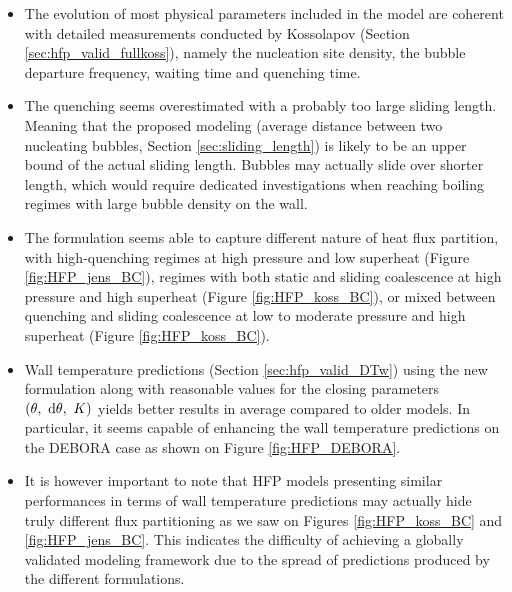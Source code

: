 \begin{itemize}
\item The evolution of most physical parameters included in the model are coherent with detailed measurements conducted by Kossolapov \cite{kossolapov_experimental_2021} (Section \ref{sec:hfp_valid_fullkoss}), namely the nucleation site density, the bubble departure frequency, waiting time and quenching time.

\item The quenching seems overestimated with a probably too large sliding length. Meaning that the proposed modeling (\ie average distance between two nucleating bubbles, Section \ref{sec:sliding_length}) is likely to be an upper bound of the actual sliding length. Bubbles may actually slide over shorter length, which would require dedicated investigations when reaching boiling regimes with large bubble density on the wall.

\item The formulation seems able to capture different nature of heat flux partition, with high-quenching regimes at high pressure and low superheat (Figure \ref{fig:HFP_jens_BC}), regimes with both static and sliding coalescence at high pressure and high superheat (Figure \ref{fig:HFP_koss_BC}), or mixed between quenching and sliding coalescence at low to moderate pressure and high superheat (Figure \ref{fig:HFP_koss_BC}).

\item Wall temperature predictions (Section \ref{sec:hfp_valid_DTw}) using the new formulation along with reasonable values for the closing parameters $\left( \theta,\ \mathrm{d}\theta,\ K  \right)$ yields better results in average compared to older models. In particular, it seems capable of enhancing the wall temperature predictions on the DEBORA case as shown on Figure \ref{fig:HFP_DEBORA}.

\item It is however important to note that HFP models presenting similar performances in terms of wall temperature predictions may actually hide truly different flux partitioning as we saw on Figures \ref{fig:HFP_koss_BC} and \ref{fig:HFP_jens_BC}. This indicates the difficulty of achieving a globally validated modeling framework due to the spread of predictions produced by the different formulations.

\end{itemize}
